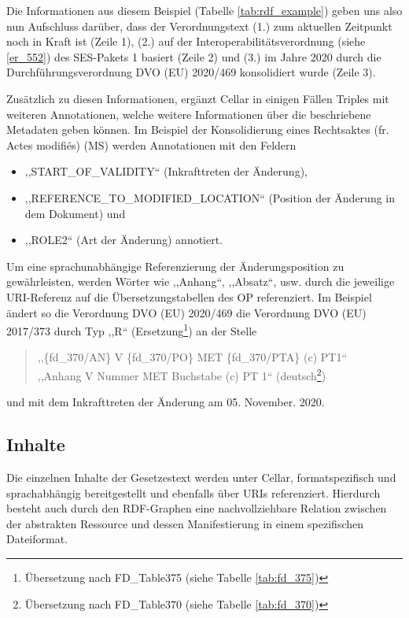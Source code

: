 \noindent
Die Informationen aus diesem Beispiel (Tabelle \ref{tab:rdf_example}) geben uns also nun Aufschluss darüber, dass der Verordnungstext (1.) zum aktuellen Zeitpunkt noch in Kraft ist (Zeile 1), (2.) auf der Interoperabilitätsverordnung (siehe \ref{er_552}) des \ac{SES}-Pakets 1 basiert (Zeile 2) und (3.) im Jahre 2020 durch die Durchführungsverordnung DVO (EU) 2020/469 konsolidiert wurde (Zeile 3).  

Zusätzlich zu diesen Informationen, ergänzt Cellar in einigen Fällen Triples mit weiteren Annotationen, welche weitere Informationen über die beschriebene Metadaten geben können.
Im Beispiel der Konsolidierung eines Rechtsaktes (fr. Actes modifiés) (MS) werden Annotationen mit den Feldern 
\begin{itemize}
    \item ,,\textsf{START\_OF\_VALIDITY}`` (Inkrafttreten der Änderung),
    \item ,,\textsf{REFERENCE\_TO\_MODIFIED\_LOCATION}`` (Position der Änderung in dem Dokument) und
    \item ,,\textsf{ROLE2}`` (Art der Änderung) annotiert.
\end{itemize}

Um eine sprachunabhängige Referenzierung der Änderungsposition zu gewährleisten, werden Wörter wie ,,Anhang``, ,,Absatz``, usw. durch die jeweilige \ac{URI}-Referenz auf die Übersetzungstabellen des \ac{OP} referenziert.
Im Beispiel ändert so die Verordnung \acs{DVO} (EU) 2020/469 die Verordnung \acs{DVO} (EU) 2017/373 durch Typ ,,R`` (Ersetzung\footnote{Übersetzung nach FD\_Table375 (siehe Tabelle \ref{tab:fd_375})}) an der Stelle 
\begin{quote}
    \centering
    \textsf{
  ,,\{fd\_370/AN\} V 
    \{fd\_370/PO\} MET 
    \{fd\_370/PTA\} (c) PT1``\\
  ,,Anhang V Nummer MET Buchstabe (c) PT 1`` (deutsch\footnote{Übersetzung nach FD\_Table370 (siehe Tabelle \ref{tab:fd_370})})
    }
    
\end{quote}
und mit dem Inkrafttreten der Änderung am 05. November. 2020.


    \subsection{Inhalte}

Die einzelnen Inhalte der Gesetzestext werden unter Cellar, formatspezifisch und sprachabhängig bereitgestellt und ebenfalls über \acp{URI} referenziert. 
Hierdurch besteht auch durch den \ac{RDF}-Graphen eine nachvollziehbare Relation zwischen der abstrakten Ressource und dessen Manifestierung in einem spezifischen Dateiformat.

